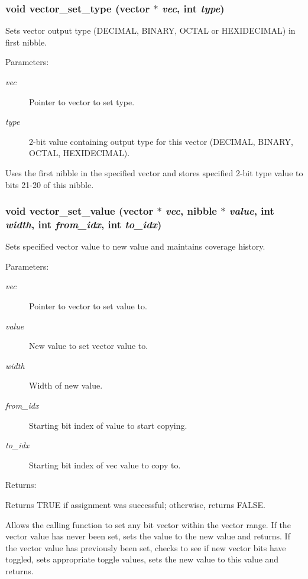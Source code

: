 \subsubsection{\setlength{\rightskip}{0pt plus 5cm}void vector\_\-set\_\-type ({\bf vector} $\ast$ {\em vec}, int {\em type})}\label{vector_8h_a13}


Sets vector output type (DECIMAL, BINARY, OCTAL or HEXIDECIMAL) in first nibble.

\begin{Desc}
\item[Parameters: ]\par
\begin{description}
\item[{\em 
vec}]Pointer to vector to set type. \item[{\em 
type}]2-bit value containing output type for this vector (DECIMAL, BINARY, OCTAL, HEXIDECIMAL).\end{description}
\end{Desc}
Uses the first nibble in the specified vector and stores specified 2-bit type value to bits 21-20 of this nibble. 
\subsubsection{\setlength{\rightskip}{0pt plus 5cm}void vector\_\-set\_\-value ({\bf vector} $\ast$ {\em vec}, {\bf nibble} $\ast$ {\em value}, int {\em width}, int {\em from\_\-idx}, int {\em to\_\-idx})}\label{vector_8h_a12}


Sets specified vector value to new value and maintains coverage history.

\begin{Desc}
\item[Parameters: ]\par
\begin{description}
\item[{\em 
vec}]Pointer to vector to set value to. \item[{\em 
value}]New value to set vector value to. \item[{\em 
width}]Width of new value. \item[{\em 
from\_\-idx}]Starting bit index of value to start copying. \item[{\em 
to\_\-idx}]Starting bit index of vec value to copy to. \end{description}
\end{Desc}
\begin{Desc}
\item[Returns: ]\par
Returns TRUE if assignment was successful; otherwise, returns FALSE.\end{Desc}
Allows the calling function to set any bit vector within the vector range. If the vector value has never been set, sets the value to the new value and returns. If the vector value has previously been set, checks to see if new vector bits have toggled, sets appropriate toggle values, sets the new value to this value and returns. 
